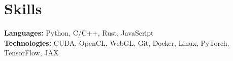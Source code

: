 \section{Skills}
\vspace{2pt}
\resumeSubHeadingListStart
{\item{
                  \textbf{Languages:}{ Python, C/C++, Rust, JavaScript} \\ \vspace{3pt}
                  \textbf{Technologies:}{ CUDA, OpenCL, WebGL, Git, Docker, Linux, PyTorch, TensorFlow, JAX}
            }}
\resumeSubHeadingListEnd

